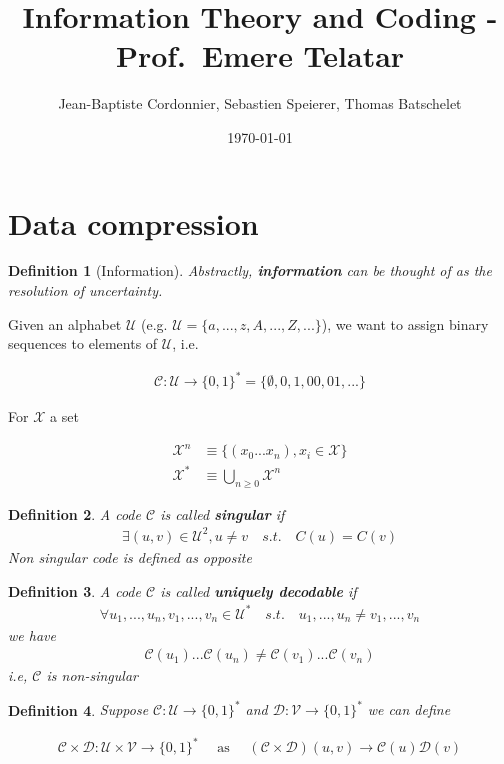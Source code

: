 \documentclass{article}
\title{Information Theory and Coding - Prof.~Emere Telatar}
\date{\today}
\author{Jean-Baptiste Cordonnier, Sebastien Speierer, Thomas Batschelet}
\newtheorem{definition}{Definition}[section]
\theoremstyle{definition} %
\def\D{\mathcal{D}}
\def\V{\mathcal{V}}
\def\U{\mathcal{U}}
\def\X{\mathcal{X}}
\def\C{\mathscr{C}}
\begin{document}
\maketitle

\section{Data compression}

\begin{definition}[Information]
  Abstractly, \textbf{information} can be thought of as the resolution of uncertainty.
\end{definition}

Given an alphabet $\U$ (e.g. $\U = \{a, ..., z, A, ..., Z, ...\}$), we want to assign binary sequences to elements of $\U$, i.e.

\begin{align*}
	\C: \U \rightarrow \{0, 1\}^* = \{\emptyset, 0, 1, 00, 01, ...\}
\end{align*}

For $\X$ a set

\begin{align*}
	\X^n &\equiv \{ (x_0 ... x_n), x_i \in \X\} \\
	\X^* &\equiv \bigcup_{n \geq 0} \X^n
\end{align*}

\begin{definition}
	A code $\C$ is called \textbf{singular} if
	\begin{align*}
		\exists (u, v) \in \U^2, u \neq v \quad s.t. \quad C(u) = C(v)
	\end{align*}
	Non singular code is defined as opposite
\end{definition}

\begin{definition}
	A code $\C$ is called \textbf{uniquely decodable} if
	\begin{align*}
		\forall u_1,...,u_n,v_1,...,v_n \in \U^* \quad s.t. \quad u_1,...,u_n \neq v_1,...,v_n
	\end{align*}
	we have
	\begin{align*}
		\C(u_1)...\C(u_n) \neq \C(v_1)...\C(v_n)
	\end{align*}
	i.e, $\C$ is non-singular
\end{definition}

\begin{definition}
	Suppose $\C : \U \rightarrow \{ 0, 1\}^*$ and $\D : \V \rightarrow \{ 0, 1\}^*$ we can define

	\begin{align*}
		\C \times \D : \U \times \V \rightarrow \{0, 1\}^*
		\quad \text{ as } \quad
		(\C \times \D)(u, v) \rightarrow \C(u)\D(v)
	\end{align*}
\end{definition}
\end{document}
